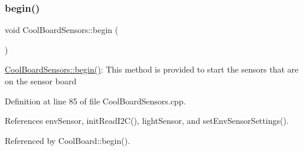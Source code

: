 \subsubsection{\texorpdfstring{begin()}{begin()}}
{\footnotesize\ttfamily void Cool\+Board\+Sensors\+::begin (\begin{DoxyParamCaption}{ }\end{DoxyParamCaption})}

\hyperlink{classCoolBoardSensors_a97095823ef7c8f5290812f1405b966b3}{Cool\+Board\+Sensors\+::begin()}\+: This method is provided to start the sensors that are on the sensor board 

Definition at line 85 of file Cool\+Board\+Sensors.\+cpp.



References env\+Sensor, init\+Read\+I2\+C(), light\+Sensor, and set\+Env\+Sensor\+Settings().



Referenced by Cool\+Board\+::begin().


